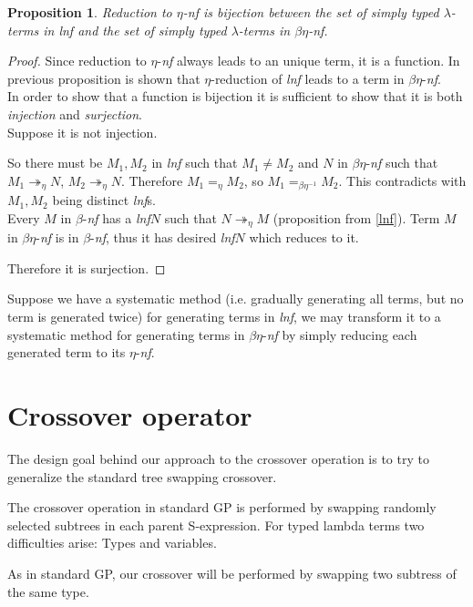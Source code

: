 \documentclass{sig-alternate}
\newtheorem{proposition}{Proposition}
\newcommand{\lterms}{$\lambda$-terms\xspace}
\newcommand{\etar}{\twoheadrightarrow_\eta}
\newcommand{\ered}{$\eta$-reduction\xspace}
\newcommand{\bnf}{$\beta$-\textit{nf}\xspace}
\newcommand{\enf}{$\eta$-\textit{nf}\xspace}
\newcommand{\benf}{$\beta\eta$-\textit{nf}\xspace}
\newcommand{\lnf}{\textit{lnf}\xspace}
\begin{document}
\begin{proposition}

Reduction to \enf is bijection between  
the set of simply typed \lterms in \lnf and 
the set of simply typed \lterms in \benf.
\end{proposition}
\begin{proof}

Since reduction to \enf always leads to an unique term, it is a function.
In previous proposition is shown that \ered of \lnf
leads to a term in \benf.\\

In order to show that a function is bijection it is sufficient to show that it is
both \textit{injection} and \textit{surjection}.\\

Suppose it is not injection.

So there must be $M_1,M_2$ in \lnf such that $M_1 \not= M_2$
and $N$ in \benf such that $M_1 \etar N$, $M_2 \etar N$.
Therefore $M_1 =_\eta M_2$, 
so $M_1 =_{\beta\eta^{-1}} M_2$.
This contradicts with $M_1,M_2$ being distinct \lnf{}s.\\

Every $M$ in \bnf has a \lnf $N$ such that 
$N \twoheadrightarrow_{\eta} M$ (proposition from \ref{lnf}).
Term $M$ in \benf is in \bnf, thus it has desired \lnf $N$
which reduces to it. 

Therefore it is surjection. 
\end{proof}

Suppose we have a systematic method (i.e. gradually generating all terms, but no term is generated twice) for generating terms in \lnf,
we may transform it to a systematic method for generating terms in \benf by simply reducing each generated term to its \enf.  


\section{Crossover operator}
\label{crossover}

The design goal behind our approach to the crossover operation is
to try to generalize the standard tree swapping crossover.


The crossover operation in standard GP is performed 
by swapping randomly selected subtrees in each parent 
S-expression.
For typed lambda terms two difficulties arise: Types and variables.

As in standard GP, our crossover will be performed by swapping
two subtress of the same type.
\end{document}
